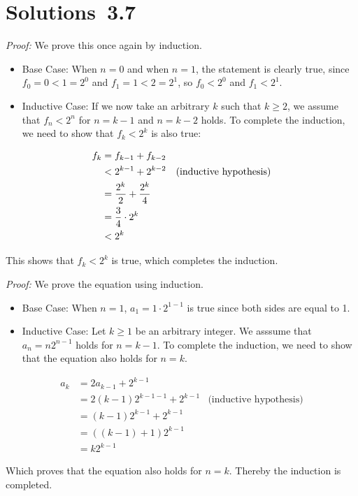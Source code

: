\section*{Solutions~3.7}%

\begin{solutions}
	
	\setcounter{solutioncounter}{0}
	\solution 
	
	\textit{Proof:} We prove this once again by induction. 
	
	\begin{itemize}
		\item Base Case: When $n = 0$ and when $n = 1$, the statement is clearly true, since $f_0 = 0 < 1 = 2^0$ and $f_1 = 1 < 2 = 2^1$, so $f_0 < 2^0$ and $f_1 < 2^1$.
		
		\item Inductive Case: If we now take an arbitrary $k$ such that $k \geq 2$, we assume that $f_n < 2^n$ for $n = k-1$ and $n = k-2$ holds. 
		To complete the induction, we need to show that $f_k < 2^k$ is also true: 
	\end{itemize}
	\begin{align*}
		f_k &= f_{k-1} + f_{k-2} \\
		&< 2^{k-1} + 2^{k-2}  &\textnormal{(inductive hypothesis)} \\
		&= \frac{2^{k}}{2} + \frac{2^{k}}{4} \\
		&= \frac{3}{4} \cdot 2^k \\
		&< 2^k
	\end{align*}	
	
		This shows that $f_k < 2^k$ is true, which completes the induction. 
		
	\solution 
	
	\textit{Proof:} We prove the equation using induction. 
	
	\begin{itemize}
		\item Base Case: When $n = 1$, $a_1 = 1\cdot2^{1-1}$ is true since both sides are equal to 1. 
		
		\item Inductive Case: Let $k \geq 1$ be an arbitrary integer. We asssume that $a_n = n2^{n-1}$ holds for $n = k-1$. 
		To complete the induction, we need to show that the equation also holds for $n = k$.
	\end{itemize}
	\begin{align*}
		a_k &= 2a_{k-1} + 2^{k-1} \\
		&= 2(k-1)2^{k-1-1} + 2^{k-1} &\text{(inductive hypothesis)} \\
		&= (k-1)2^{k-1} + 2^{k-1} \\
		&= ((k-1)+1)2^{k-1} \\
		&= k2^{k-1}
	\end{align*}	
	
	Which proves that the equation also holds for $n=k$. Thereby the induction is completed.  
	
\end{solutions}

